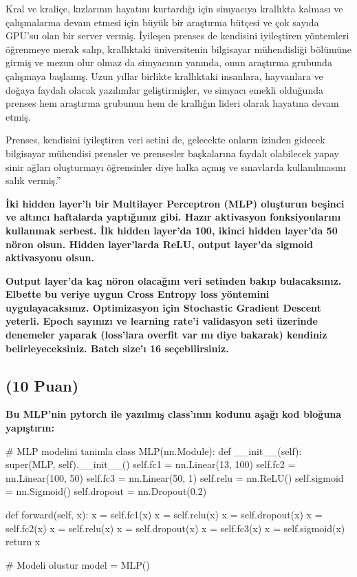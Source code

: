 \documentclass[11pt]{article}
\begin{document}
Kral ve kraliçe, kızlarının hayatını kurtardığı için simyacıya krallıkta kalması ve çalışmalarına devam etmesi için büyük bir araştırma bütçesi ve çok sayıda GPU'su olan bir server vermiş. İyileşen prenses de kendisini iyileştiren yöntemleri öğrenmeye merak salıp, krallıktaki üniversitenin bilgisayar mühendisliği bölümüne girmiş ve mezun olur olmaz da simyacının yanında, onun araştırma grubunda çalışmaya başlamış. Uzun yıllar birlikte krallıktaki insanlara, hayvanlara ve doğaya faydalı olacak yazılımlar geliştirmişler, ve simyacı emekli olduğunda prenses hem araştırma grubunun hem de krallığın lideri olarak hayatına devam etmiş.

Prenses, kendisini iyileştiren veri setini de, gelecekte onların izinden gidecek bilgisayar mühendisi prensler ve prensesler başkalarına faydalı olabilecek yapay sinir ağları oluşturmayı öğrensinler diye halka açmış ve sınavlarda kullanılmasını salık vermiş.''

\textbf{İki hidden layer'lı bir Multilayer Perceptron (MLP) oluşturun beşinci ve altıncı haftalarda yaptığımız gibi. Hazır aktivasyon fonksiyonlarını kullanmak serbest. İlk hidden layer'da 100, ikinci hidden layer'da 50 nöron olsun. Hidden layer'larda ReLU, output layer'da sigmoid aktivasyonu olsun.}

\textbf{Output layer'da kaç nöron olacağını veri setinden bakıp bulacaksınız. Elbette bu veriye uygun Cross Entropy loss yöntemini uygulayacaksınız. Optimizasyon için Stochastic Gradient Descent yeterli. Epoch sayınızı ve learning rate'i validasyon seti üzerinde denemeler yaparak (loss'lara overfit var mı diye bakarak) kendiniz belirleyeceksiniz. Batch size'ı 16 seçebilirsiniz.}

\subsection{(10 Puan)} \textbf{Bu MLP'nin pytorch ile yazılmış class'ının kodunu aşağı kod bloğuna yapıştırın:}

\begin{python}
# MLP modelini tanimla
class MLP(nn.Module):
    def __init__(self):
        super(MLP, self).__init__()
        self.fc1 = nn.Linear(13, 100)
        self.fc2 = nn.Linear(100, 50)
        self.fc3 = nn.Linear(50, 1)
        self.relu = nn.ReLU()
        self.sigmoid = nn.Sigmoid()
        self.dropout = nn.Dropout(0.2)
        
    def forward(self, x):
        x = self.fc1(x)
        x = self.relu(x)
        x = self.dropout(x)
        x = self.fc2(x)
        x = self.relu(x)
        x = self.dropout(x)
        x = self.fc3(x)
        x = self.sigmoid(x)
        return x

# Modeli olustur
model = MLP()
\end{python}
\end{document}
